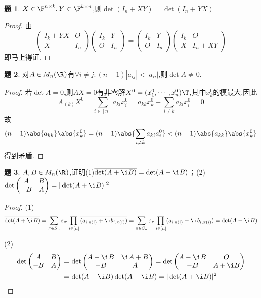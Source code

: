 \documentclass{article}
\newcommand{\matrixtwo}[4]{\begin{pmatrix}#1&#2\\#3&#4 \end{pmatrix}}
\theoremstyle{definition}
\newtheorem{exercise}{题}[section]
\begin{document}
\begin{exercise}
    $X\in \F^{n\times k}, Y\in \F^{k\times n}$,则$\det(I_n+XY)=\det (I_n+YX)$
\end{exercise}
\begin{proof}
    由$$\matrixtwo{I_k+YX}{O}{X}{I_n}\matrixtwo{I_k}{Y}{O}{I_n}=\matrixtwo{I_k}{Y}{O}{I_n}\matrixtwo{I_k}{O}{X}{I_n+XY}$$
    即马上得证.
\end{proof}

\begin{exercise}
    对$A\in M_n(\R)$有$\forall i\neq j: (n-1)|a_{ij}|<|a_{ii}|$,则$\det A\neq 0$.
\end{exercise}
\begin{proof}
    若$\det A=0$,则$AX=0$有非零解$X^0=(x^0_1,\cdots,x^0_n)\T$,其中$x_k^0$的模最大,因此
    $$A_{(k)}X^0=\sum_{i\in [n]}a_{ki}x^0_i=a_{kk}x^0_k+\sum_{i\neq k}a_{ki}x^0_i=0$$
    故$$(n-1)\abs{a_{kk}}\abs{x^0_k}=(n-1)\abs{\sum_{i\neq k}a_{ki}a^0_i}<(n-1)\abs{a_{kk}}\abs{x^0_k}$$
    得到矛盾.
\end{proof}

\begin{exercise}
    $A,B\in M_n(\R)$,证明(1)$\overline{\det (A+\i B)}=\det (A-\i B)$；(2)$\det \matrixtwo{A}{B}{-B}{A}=|\det(A+\i B)|^2$
\end{exercise}
\begin{proof}
    (1)$$\overline{\det (A+\i B)}=\sum_{\pi\in S_n}\varepsilon_\pi \prod_{i\in [n]}\overline{(a_{i,\pi(i)}+\i b_{i,\pi(i)})}=\sum_{\pi\in S_n}\varepsilon_\pi \prod_{i\in [n]}(a_{i,\pi(i)}-\i b_{i,\pi(i)})=\det (A-\i B)$$


    (2)$$\begin{aligned}
    \det\matrixtwo{A}{B}{-B}{A}&=\det\matrixtwo{A-\i B}{\i A+B}{-B}{A}=\det\matrixtwo{A-\i B}{O}{-B}{A+\i B}\\
    &=\det(A-\i B)\det(A+\i B)=|\det(A+\i B)|^2
    \end{aligned}$$
\end{proof}
\end{document}
